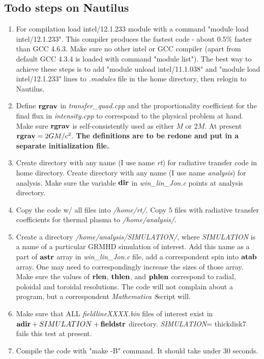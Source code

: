 \documentclass{emulateapj}
\newcommand{\mat}{\textit{Mathematica 8}}
\begin{document}
\subsection{Todo steps on Nautilus}
\begin{enumerate}
\item{For compilation load intel/12.1.233 module with a command "module load intel/12.1.233". This compiler produces the fastest code - about $0.5\%$ faster than GCC 4.6.3.
Make sure no other intel or GCC compiler (apart from default GCC 4.3.4 is loaded with command "module list").
The best way to achieve these steps is to add  "module unload intel/11.1.038" and "module load intel/12.1.233" lines to \textit{.modules} file in the home directory, 
then relogin to Nautilus.}
\item{Define ${\bf rgrav}$ in \textit{transfer\_quad.cpp} and the proportionality coefficient for the final flux in \textit{intensity.cpp} to correspond to the physical problem at hand. 
Make sure ${\bf rgrav}$ is self-consistently used as either $M$ or $2M$. At present ${\bf rgrav}=2GM/c^2$. \textbf{The definitions are to be redone and put in a separate initialization file.}}
\item{Create directory with any name (I use name \textit{rt}) for radiative transfer code in home directory. Create directory with any name (I use name \textit{analysis}) 
for analysis. Make sure the variable ${\bf dir}$ in \textit{win\_lin\_Jon.c} points at analysis directory.}
\item{Copy the code w/ all files into \textit{/home/rt/}. Copy $5$ files with radiative transfer coefficients for thermal plasma to \textit{/home/analysis/}.}
\item{Create a directory \textit{/home/analysis/SIMULATION/}, where \textit{SIMULATION} is a name of a particular GRMHD simulation of interest. 
Add this name as a part of ${\bf astr}$ array in \textit{win\_lin\_Jon.c} file, add a correspondent spin into ${\bf atab}$ array.
One may need to correspondingly increase the sizes of those array. Make sure the values of ${\bf rlen}$, ${\bf thlen}$, and ${\bf phlen}$ correspond to radial, 
poloidal and toroidal resolutions. The code will not complain about a program, but a correspondent \mat script will.}
\item{Make sure that ALL \textit{fieldlineXXXX.bin} files of interest exist in ${\bf adir}+ SIMULATION +{\bf fieldstr}$ directory. \textit{SIMULATION}= thickdisk7 fails this test at present.}
\item{Compile the code with "make -B" command. It should take under 30 seconds.}

\end{enumerate}
\end{document}
